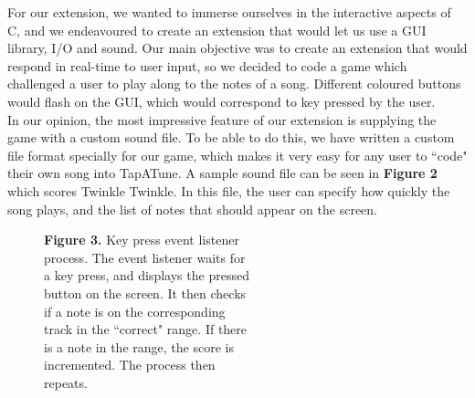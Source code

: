 \documentclass[11pt]{article}
\begin{document}
For our extension, we wanted to immerse ourselves in the interactive aspects of C, and we endeavoured to create an extension that would let us use a GUI library, I/O and sound. Our main objective was to create an extension that would respond in real-time to user input, so we decided to code a game which challenged a user to play along to the notes of a song. Different coloured buttons would flash on the GUI, which would correspond to key pressed by the user.
\\ In our opinion, the most impressive feature of our extension is supplying the game with a custom sound file. To be able to do this, we have written a custom file format specially for our game, which makes it very easy for any user to ``code" their own song into TapATune. A sample sound file can be seen in \textbf{Figure 2} which scores Twinkle Twinkle. In this file, the user can specify how quickly the song plays, and the list of notes that should appear on the screen.

\begin{figure}
  \vspace{-1em}
  \hspace*{4em}
  \raggedright
  
  \setlength{\belowcaptionskip}{-4em}
  \captionsetup{justification=justified,singlelinecheck=false}
  \caption*{\hspace*{2.0em}\fontsize{9}{9}\selectfont \textbf{Figure 3.} Key press event listener \\\hspace*{2.2em}process. The event listener waits for \\\hspace*{2.2em}a key press, and displays the pressed \\\hspace*{2.2em}button on the screen. It then checks\\\hspace*{2.2em}if a note is on the corresponding\\\hspace*{2.2em}track in the ``correct" range. If there\\\hspace*{2.2em}is a note in the range, the score is \\\hspace*{2.2em}incremented. The process then\\\hspace*{2.2em}repeats.}
\end{figure}
\end{document}
